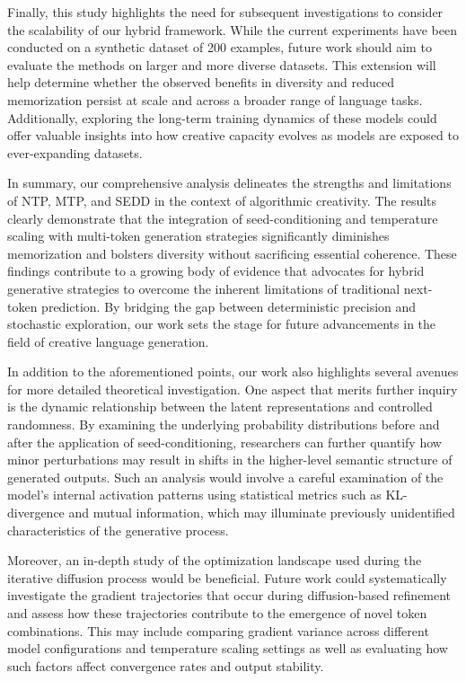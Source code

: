 \documentclass{article} %
\begin{document}
Finally, this study highlights the need for subsequent investigations to consider the scalability of our hybrid framework. While the current experiments have been conducted on a synthetic dataset of 200 examples, future work should aim to evaluate the methods on larger and more diverse datasets. This extension will help determine whether the observed benefits in diversity and reduced memorization persist at scale and across a broader range of language tasks. Additionally, exploring the long-term training dynamics of these models could offer valuable insights into how creative capacity evolves as models are exposed to ever-expanding datasets.

In summary, our comprehensive analysis delineates the strengths and limitations of NTP, MTP, and SEDD in the context of algorithmic creativity. The results clearly demonstrate that the integration of seed-conditioning and temperature scaling with multi-token generation strategies significantly diminishes memorization and bolsters diversity without sacrificing essential coherence. These findings contribute to a growing body of evidence that advocates for hybrid generative strategies to overcome the inherent limitations of traditional next-token prediction. By bridging the gap between deterministic precision and stochastic exploration, our work sets the stage for future advancements in the field of creative language generation.

In addition to the aforementioned points, our work also highlights several avenues for more detailed theoretical investigation. One aspect that merits further inquiry is the dynamic relationship between the latent representations and controlled randomness. By examining the underlying probability distributions before and after the application of seed-conditioning, researchers can further quantify how minor perturbations may result in shifts in the higher-level semantic structure of generated outputs. Such an analysis would involve a careful examination of the model’s internal activation patterns using statistical metrics such as KL-divergence and mutual information, which may illuminate previously unidentified characteristics of the generative process.

Moreover, an in-depth study of the optimization landscape used during the iterative diffusion process would be beneficial. Future work could systematically investigate the gradient trajectories that occur during diffusion-based refinement and assess how these trajectories contribute to the emergence of novel token combinations. This may include comparing gradient variance across different model configurations and temperature scaling settings as well as evaluating how such factors affect convergence rates and output stability.
\end{document}
